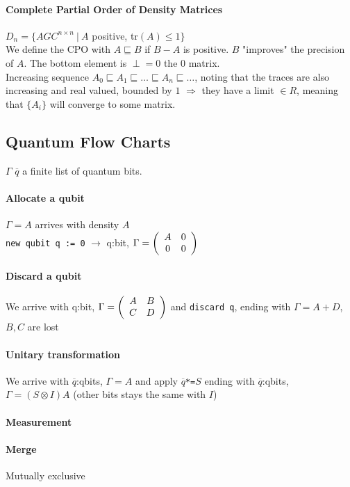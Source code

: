 \documentclass[10pt]{report}
\begin{document}
\paragraph{Complete Partial Order of Density Matrices} $D_n=\{AGC^{n\times n}\:|\: A$ positive, tr$(A)\leq 1\}$\\
We define the CPO with $A\sqsubseteq B$ if $B-A$ is positive. $B$ "improves" the precision of $A$. The bottom element is $\perp = 0$ the 0 matrix.\\
Increasing sequence $A_0 \sqsubseteq A_1\sqsubseteq\ldots\sqsubseteq A_n\sqsubseteq\ldots$, noting that the traces are also increasing and real valued, bounded by $1$ $\Rightarrow$ they have a limit $\in R$, meaning that $\{A_i\}$ will converge to some matrix.
\subsection{Quantum Flow Charts} $\Gamma$ %
$\overline{q}$ a finite list of quantum bits.
\paragraph{Allocate a qubit} $\Gamma = A$ arrives with density $A$\\
\texttt{new qubit q := 0} $\rightarrow$ q:bit, $\Gamma=\left(\begin{array}{c c}
A & 0\\0&0
\end{array}\right)$
\paragraph{Discard a qubit} We arrive with q:bit, $\Gamma = \left(\begin{array}{c c}
A & B\\C&D
\end{array}\right)$ and \texttt{discard q}, ending with $\Gamma = A + D$, $B,C$ are lost
\paragraph{Unitary transformation} We arrive with $\overline{q}$:qbits, $\Gamma =A$ and apply $\overline{q}$\texttt{*=}$S$ ending with $\overline{q}$:qbits, $\Gamma = (S\otimes I)A$ (other bits stays the same with $I$) %
\paragraph{Measurement} %
\paragraph{Merge} Mutually exclusive %
\end{document}

